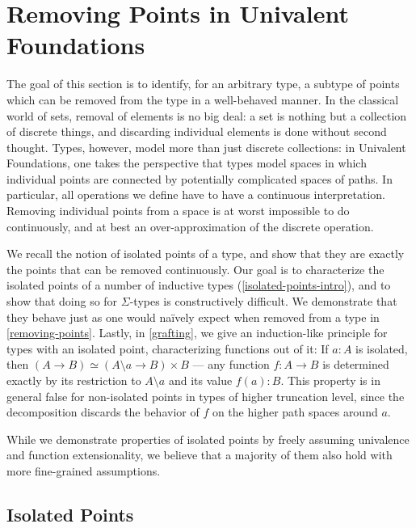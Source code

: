 \section{Removing Points in Univalent Foundations}\label{isolated-points}

The goal of this section is to identify, for an arbitrary type, a subtype of points which can be removed from the type in a well-behaved manner.
In the classical world of sets, removal of elements is no big deal:
a set is nothing but a collection of discrete things, and discarding individual elements is done without second thought.
Types, however, model more than just discrete collections:
in Univalent Foundations, one takes the perspective that types model spaces
in which individual points are connected by potentially complicated spaces of paths.
In particular, all operations we define have to have a continuous interpretation.
Removing individual points from a space is at worst impossible to do continuously,
and at best an over-approximation of the discrete operation.

We recall the notion of isolated points of a type, and show that they are exactly the points that can be removed continuously.
Our goal is to characterize the isolated points of a number of inductive types (\autoref{isolated-points-intro}),
and to show that doing so for \( \Sigma \)-types is constructively difficult.
We demonstrate that they behave just as one would na{\"i}vely expect when removed from a type in \autoref{removing-points}.
Lastly, in \autoref{grafting}, we give an induction-like principle for types with an isolated point, characterizing functions out of it:
If \( a : A \) is isolated, then \( (A \to B) \simeq (A \setminus a \to B) \times B \)
--- any function \( f : A \to B \) is determined exactly by its restriction to \( A \setminus a \) and its value \( f(a) : B \).
This property is in general false for non-isolated points in types of higher truncation level,
since the decomposition discards the behavior of \( f \) on the higher path spaces around \( a \).

While we demonstrate properties of isolated points by freely assuming univalence and function extensionality,
we believe that a majority of them also hold with more fine-grained assumptions. %

\subsection{Isolated Points}\label{isolated-points-intro}

